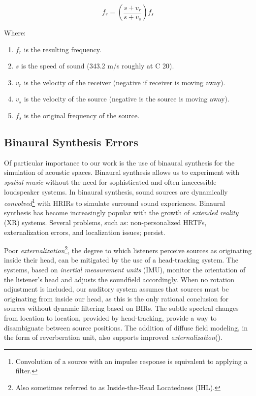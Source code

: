 \begin{equation}
f_{r}=\left(\frac{s+v_{r}}{s+v_{s}}\right) f_{s}
\label{eq:doppler}
\end{equation}

Where: 
\begin{enumerate}
    \item $f_r$ is the resulting frequency.
    \item $s$ is the speed of sound (343.2 m/s roughly at C 20\textdegree).
    \item $v_r$ is the velocity of the receiver (negative if receiver is moving away). 
    \item $v_s$ is the velocity of the source (negative is the source is moving away).
    \item $f_s$ is the original frequency of the source.
\end{enumerate}

\subsection{Binaural Synthesis Errors}

Of particular importance to our work is the use of binaural synthesis for the simulation of acoustic spaces. Binaural synthesis allows us to experiment with \textit{spatial music} without the need for sophisticated and often inaccessible loudspeaker systems. In binaural synthesis, sound sources are dynamically \textit{convolved}\footnote{Convolution of a source with an impulse response is equivalent to applying a filter.} with HRIRs to simulate surround sound experiences. Binaural synthesis has become increasingly popular with the growth of \textit{extended reality} (XR) systems. Several problems, such as: non-personalized HRTFs, externalization errors, and localization issues; persist. 


Poor \textit{externalization}\footnote{Also sometimes referred to as Inside-the-Head Locatedness (IHL).}, the degree to which listeners perceive sources as originating inside their head, can be mitigated by the use of a head-tracking system. The systems, based on \textit{inertial measurement units} (IMU), monitor the orientation of the listener's head and adjusts the soundfield accordingly. When no rotation adjustment is included, our auditory system assumes that sources must be originating from inside our head, as this is the only rational conclusion for sources without dynamic filtering based on BIRs. The subtle spectral changes from location to location, provided by head-tracking, provide a way to disambiguate between source positions. The addition of diffuse field modeling, in the form of reverberation unit, also supports improved \textit{externalization}(\cite{sakamoto1976out}). 


